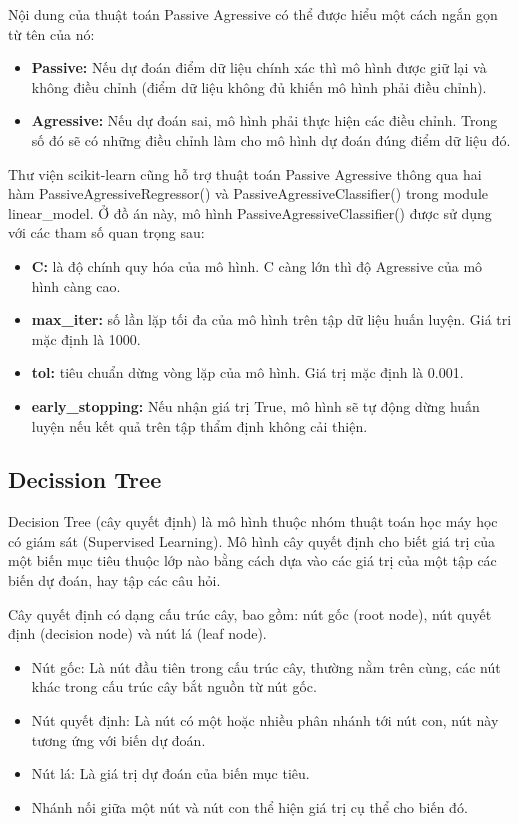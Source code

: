 \documentclass[12pt,a4paper,oneside]{book}
\begin{document}
		Nội dung của thuật toán Passive Agressive có thể được hiểu một cách ngắn gọn từ tên của nó:

		\begin{itemize}
		\item \textbf{Passive:} Nếu dự đoán điểm dữ liệu chính xác thì mô hình được giữ lại và không điều chỉnh (điểm dữ liệu không đủ khiến mô hình phải điều chỉnh).
		\item \textbf{Agressive:} Nếu dự đoán sai, mô hình phải thực hiện các điều chỉnh. Trong số đó sẽ có những điều chỉnh làm cho mô hình dự đoán đúng điểm dữ liệu đó.
		\end{itemize}
		
		Thư viện scikit-learn cũng hỗ trợ thuật toán Passive Agressive thông qua hai hàm PassiveAgressiveRegressor() và PassiveAgressiveClassifier() trong module linear\_model.
		Ở đồ án này, mô hình PassiveAgressiveClassifier() được sử dụng với các tham số quan trọng sau:
		\begin{itemize}
		\item \textbf{C:} là độ chính quy hóa của mô hình. C càng lớn thì độ Agressive của mô hình càng cao.
		\item \textbf{max\_iter:} số lần lặp tối đa của mô hình trên tập dữ liệu huấn luyện. Giá tri mặc định là 1000.
		\item \textbf{tol:} tiêu chuẩn dừng vòng lặp của mô hình. Giá trị mặc định là 0.001.
		\item \textbf{early\_stopping:} Nếu nhận giá trị True, mô hình sẽ tự động dừng huấn luyện nếu kết quả trên tập thẩm định không cải thiện.
		\end{itemize}
		\subsection{Decission Tree}
		Decision Tree (cây quyết định) là mô hình thuộc nhóm thuật toán học máy học có giám sát (Supervised Learning). Mô hình cây quyết định cho biết giá trị của một biến mục tiêu thuộc lớp nào bằng cách dựa vào các giá trị của một tập các biến dự đoán, hay tập các câu hỏi.
		
		Cây quyết định có dạng cấu trúc cây, bao gồm: nút gốc (root node), nút quyết định (decision node) và nút lá (leaf node).
		
		\begin{itemize}
		\item Nút gốc: Là nút đầu tiên trong cấu trúc cây, thường nằm trên cùng, các nút khác trong cấu trúc cây bắt nguồn từ nút gốc.
		\item Nút quyết định: Là nút có một hoặc nhiều phân nhánh tới nút con, nút này tương ứng với biến dự đoán.
		\item Nút lá: Là giá trị dự đoán của biến mục tiêu.
		\item Nhánh nối giữa một nút và nút con thể hiện giá trị cụ thể cho biến đó.
		\end{itemize}
		
\end{document}
